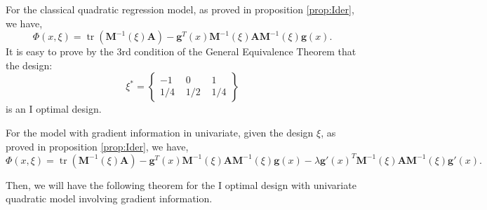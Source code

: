 \documentclass[preprint,12pt]{elsarticle}
\DeclareMathOperator{\tr}{tr} \DeclareMathOperator{\err}{err}
\begin{document}
For the classical quadratic regression model, as proved in
proposition \ref{prop:Ider}, we have,
$$\Phi(x,\xi)=\tr\left(\boldsymbol{M}^{-1}(\xi)\boldsymbol{A}\right)-\boldsymbol{g}^T(x)\boldsymbol{M}^{-1}(\xi)\boldsymbol{A}\boldsymbol{M}^{-1}(\xi)\boldsymbol{g}(x).$$
It is easy to prove by the $3$rd condition of the General
Equivalence Theorem that the design:
$$\xi^*=\left\{\begin{array}{ccc}-1\,\,&0\,\,&1\\1/4\,\,&1/2\,\,&1/4\end{array}\right\}$$
is an I optimal design.

For the model with gradient information in univariate, given the
design $\xi$, as proved in proposition \ref{prop:Ider}, we have,
$$\Phi(x,\xi)=\tr\left(\boldsymbol{M}^{-1}(\xi)\boldsymbol{A}\right)-\boldsymbol{g}^T(x)\boldsymbol{M}^{-1}(\xi)\boldsymbol{A}\boldsymbol{M}^{-1}(\xi)\boldsymbol{g}(x)-\lambda\boldsymbol{g}'(x)^T\boldsymbol{M}^{-1}(\xi)\boldsymbol{A}\boldsymbol{M}^{-1}(\xi)\boldsymbol{g}'(x).$$

Then, we will have the following theorem for the I optimal design
with univariate quadratic model involving gradient information.
\end{document}
